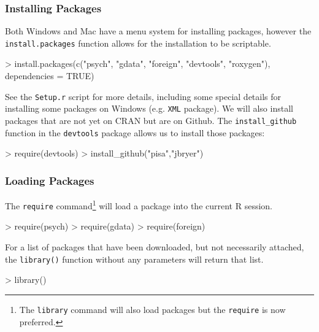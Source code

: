 \documentclass[10pt,slidestop,mathserif,c]{beamer}
\begin{document}
\begin{frame}[containsverbatim]
	\frametitle{Installing Packages}
	Both Windows and Mac have a menu system for installing packages, however the \texttt{install.packages} function allows for the installation to be scriptable.
\begin{Schunk}
\begin{Sinput}
> install.packages(c("psych", "gdata", "foreign", "devtools", 
   "roxygen"), dependencies = TRUE)
\end{Sinput}
\end{Schunk}
\vfill
See the \texttt{Setup.r} script for more details, including some special details for installing some packages on Windows (e.g. \texttt{XML} package).
\vfill
We will also install packages that are not yet on CRAN but are on Github. The \texttt{install\_github} function in the \texttt{devtools} package allows us to install those packages:
\begin{Schunk}
\begin{Sinput}
> require(devtools)
> install_github("pisa","jbryer")
\end{Sinput}
\end{Schunk}

\end{frame}

\begin{frame}
	\frametitle{Loading Packages}
	The \texttt{require} command\footnote{The \texttt{library} command will also load packages but the \texttt{require} is now preferred.} will load a package into the current R session.
\begin{Schunk}
\begin{Sinput}
> require(psych)
> require(gdata)
> require(foreign)
\end{Sinput}
\end{Schunk}
	\pause
	\vfill
	For a list of packages that have been downloaded, but not necessarily attached, the \texttt{library()} function without any parameters will return that list.
\begin{Schunk}
\begin{Sinput}
> library()
\end{Sinput}
\end{Schunk}
\end{frame}
\end{document}
